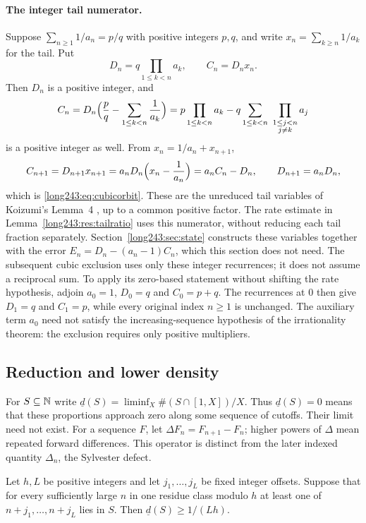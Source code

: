 \documentclass[11pt]{article}
\begin{document}
\paragraph{The integer tail numerator.}
Suppose $\sum_{n\ge1}1/a_n=p/q$ with positive integers $p,q$, and write
$x_n=\sum_{k\ge n}1/a_k$ for the tail.  Put
\[
 D_n=q\prod_{1\le k<n}a_k,\qquad C_n=D_nx_n .
\]
Then $D_n$ is a positive integer, and
\[
 C_n=D_n\Bigl(\frac pq-\sum_{1\le k<n}\frac1{a_k}\Bigr)
    =p\prod_{1\le k<n}a_k-q\sum_{1\le k<n}\ \prod_{\substack{1\le j<n\\ j\ne k}}a_j
\]
is a positive integer as well.  From $x_n=1/a_n+x_{n+1}$,
\[
 C_{n+1}=D_{n+1}x_{n+1}=a_nD_n\Bigl(x_n-\frac1{a_n}\Bigr)=a_nC_n-D_n,
 \qquad D_{n+1}=a_nD_n,
\]
which is \eqref{long243:eq:cubicorbit}. These are the unreduced tail variables of Koizumi's
Lemma~4 \cite[pp.~11--12]{koizumi2025}, up to a common positive factor.
The rate estimate in Lemma~\ref{long243:res:tailratio} uses this numerator,
without reducing each tail fraction separately.
Section~\ref{long243:sec:state} constructs these variables together with
the error $E_n=D_n-(a_n-1)C_n$, which this section does not need.  The subsequent cubic exclusion uses only these integer recurrences;
it does not assume a reciprocal sum. To apply its zero-based statement
without shifting the rate hypothesis, adjoin $a_0=1$, $D_0=q$ and
$C_0=p+q$. The recurrences at $0$ then give $D_1=q$ and $C_1=p$,
while every original index $n\ge1$ is unchanged. The auxiliary term
$a_0$ need not satisfy the increasing-sequence hypothesis of the
irrationality theorem: the exclusion requires only positive multipliers.

\subsection{Reduction and lower density}

For $S\subseteq\mathbb{N}$ write $\underline d(S)=\liminf_X\#(S\cap[1,X])/X$.
Thus $\underline d(S)=0$ means that these proportions approach zero
along some sequence of cutoffs. Their limit need not exist.
For a sequence $F$, let $\Delta F_n=F_{n+1}-F_n$; higher powers of
$\Delta$ mean repeated forward differences. This operator is distinct
from the later indexed quantity $\Delta_n$, the Sylvester defect.

\begin{lemma}\label{long243:res:periodicobstruction}
Let $h,L$ be positive integers and let $j_1,\ldots,j_L$ be fixed integer
offsets. Suppose that for every sufficiently large $n$ in one residue
class modulo $h$ at least one of $n+j_1,\ldots,n+j_L$ lies in $S$.
Then $\underline d(S)\ge1/(Lh)$.
\end{lemma}
\end{document}
